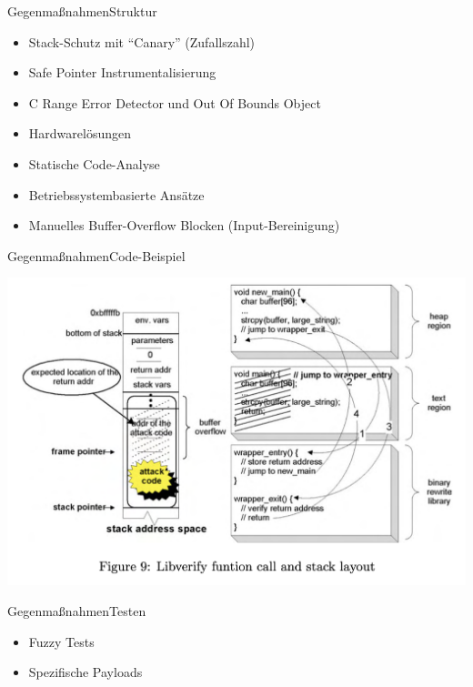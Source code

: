 \begin{frame}{Gegenmaßnahmen}{Struktur}
\begin{itemize}
    \item Stack-Schutz mit ``Canary'' (Zufallszahl)
    \item Safe Pointer Instrumentalisierung
    \item C Range Error Detector und Out Of Bounds Object
    \item Hardwarelösungen
    \item Statische Code-Analyse
    \item Betriebssystembasierte Ansätze
    \item Manuelles Buffer-Overflow Blocken (Input-Bereinigung)
\end{itemize}
\end{frame}



\begin{frame}{Gegenmaßnahmen}{Code-Beispiel}
    \begin{center}
        \includegraphics[width=\textwidth,height=0.75\textheight,keepaspectratio]{images/Libverify.png}
    \end{center}
\end{frame}

\begin{frame}{Gegenmaßnahmen}{Testen}
    \begin{itemize}
        \item Fuzzy Tests
        \item Spezifische Payloads
    \end{itemize}
\end{frame}